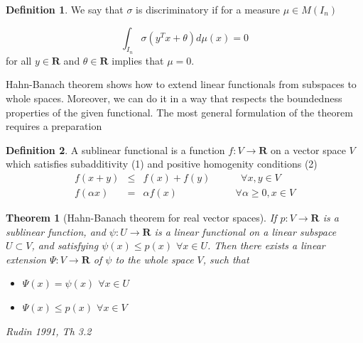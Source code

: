 \documentclass[]{article}
\newtheorem{theorem}{Theorem}[section]
\theoremstyle{definition}
\newtheorem{definition}{Definition}[section]
\begin{document}
\begin{definition}
We say that $\sigma$ is discriminatory if for a measure $\mu \in M(I_n)$ 

$$
\int_{I_n} \sigma \left( y^Tx + \theta \right) d\mu(x) = 0
$$
for all $y\in \mathbf{R}$ and $\theta \in \mathbf{R}$ implies that $\mu = 0$.
	
\end{definition}


Hahn-Banach theorem shows how to extend linear functionals from subspaces to whole spaces. Moreover, we can do it in a way that respects the boundedness
properties of the given functional. The most general formulation of the theorem requires a preparation

\begin{definition}
A sublinear functional is a function $f:V \rightarrow \mathbf{R}$ on a vector space $V$ which satisfies subadditivity (1) and positive homogenity conditions (2)
\begin{eqnarray}
f\left(x+y\right) &\leq& f\left(x\right) + f\left(y\right) \;\;\;\;\;\;\;\;\;\;\;\forall x,y  \in V \\
f\left(\alpha x\right) &=&\alpha f\left(x\right) \;\;\;\;\;\;\;\;\;\;\;\;\;\;\;\;\;\;\;\;\; \forall \alpha\geq 0, x \in V
\end{eqnarray}
\end{definition}

\begin{theorem}[Hahn-Banach theorem for real vector spaces]
	If $p : V \rightarrow \mathbf{R}$ is a sublinear function, and $\psi : U \rightarrow \mathbf{R}$ is a linear functional on a linear subspace $U \subset V$, and satisfying $\psi(x) \leq p(x)$ $\forall x \in U$.
	Then there exists a linear extension $\Psi:V \rightarrow \mathbf{R}$ of $\psi$ to the whole space $V$, such that
	
	\begin{itemize}
		\item $\Psi(x) = \psi(x)$ $\forall x \in U$
		\item $\Psi(x) \leq p(x)$ $\forall x \in V$
	\end{itemize}
	
	Rudin 1991, Th 3.2
	
\end{theorem}
\end{document}
